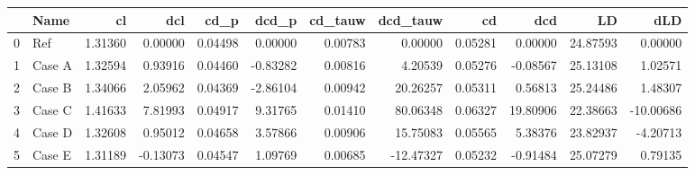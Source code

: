 \begin{tabular}{llrrrrrrrrrr}
\toprule
{} &    Name &      cl &      dcl &    cd\_p &    dcd\_p &  cd\_tauw &  dcd\_tauw &      cd &      dcd &       LD &       dLD \\
\midrule
0 &     Ref & 1.31360 &  0.00000 & 0.04498 &  0.00000 &  0.00783 &   0.00000 & 0.05281 &  0.00000 & 24.87593 &   0.00000 \\
1 &  Case A & 1.32594 &  0.93916 & 0.04460 & -0.83282 &  0.00816 &   4.20539 & 0.05276 & -0.08567 & 25.13108 &   1.02571 \\
2 &  Case B & 1.34066 &  2.05962 & 0.04369 & -2.86104 &  0.00942 &  20.26257 & 0.05311 &  0.56813 & 25.24486 &   1.48307 \\
3 &  Case C & 1.41633 &  7.81993 & 0.04917 &  9.31765 &  0.01410 &  80.06348 & 0.06327 & 19.80906 & 22.38663 & -10.00686 \\
4 &  Case D & 1.32608 &  0.95012 & 0.04658 &  3.57866 &  0.00906 &  15.75083 & 0.05565 &  5.38376 & 23.82937 &  -4.20713 \\
5 &  Case E & 1.31189 & -0.13073 & 0.04547 &  1.09769 &  0.00685 & -12.47327 & 0.05232 & -0.91484 & 25.07279 &   0.79135 \\
\bottomrule
\end{tabular}
